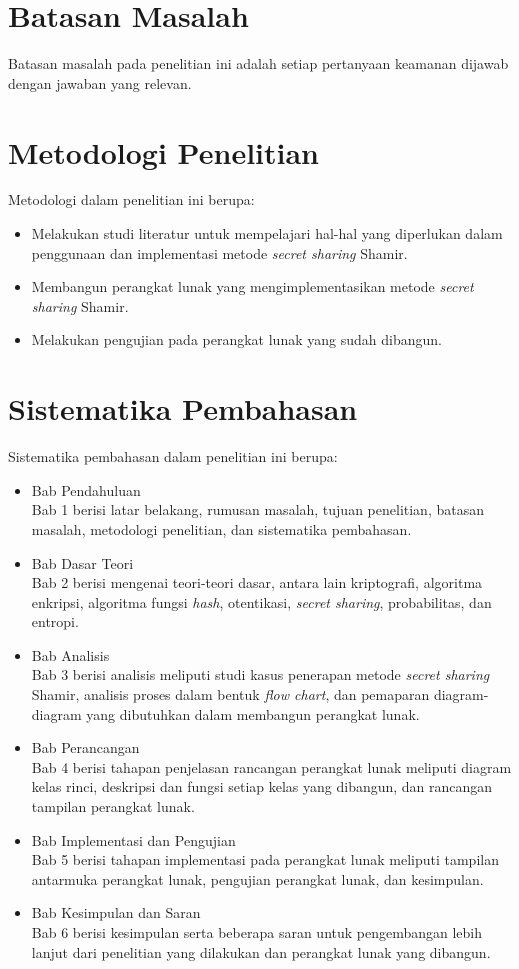 \section{Batasan Masalah}
\label{sec:batasan masalah}

Batasan masalah pada penelitian ini adalah setiap pertanyaan keamanan dijawab dengan jawaban yang relevan.

\section{Metodologi Penelitian}
\label{sec:metodologi penelitian}

Metodologi dalam penelitian ini berupa:
\begin{itemize}
	\item Melakukan studi literatur untuk mempelajari hal-hal yang diperlukan dalam penggunaan dan implementasi metode \textit{secret sharing} Shamir.
	\item Membangun perangkat lunak yang mengimplementasikan metode \textit{secret sharing} Shamir.
	\item Melakukan pengujian pada perangkat lunak yang sudah dibangun.
\end{itemize}

\section{Sistematika Pembahasan}
\label{sec:sistematika pembahasan}

Sistematika pembahasan dalam penelitian ini berupa:
\begin{itemize}
	\item Bab Pendahuluan
	\\Bab 1 berisi latar belakang, rumusan masalah, tujuan penelitian, batasan masalah, metodologi penelitian, dan sistematika pembahasan.
	\item Bab Dasar Teori
	\\Bab 2 berisi mengenai teori-teori dasar, antara lain kriptografi, algoritma enkripsi, algoritma fungsi \textit{hash}, otentikasi, \textit{secret sharing}, probabilitas, dan entropi.
	\item Bab Analisis
	\\Bab 3 berisi analisis meliputi studi kasus penerapan metode \textit{secret sharing} Shamir, analisis proses dalam bentuk \textit{flow chart}, dan pemaparan diagram-diagram yang dibutuhkan dalam membangun perangkat lunak.
	\item Bab Perancangan
	\\Bab 4 berisi tahapan penjelasan rancangan perangkat lunak meliputi diagram kelas rinci, deskripsi dan fungsi setiap kelas yang dibangun, dan rancangan tampilan perangkat lunak.
	\item Bab Implementasi dan Pengujian
	\\Bab 5 berisi tahapan implementasi pada perangkat lunak meliputi tampilan antarmuka perangkat lunak, pengujian perangkat lunak, dan kesimpulan.
	\item Bab Kesimpulan dan Saran
	\\Bab 6 berisi kesimpulan serta beberapa saran untuk pengembangan lebih lanjut dari penelitian yang dilakukan dan perangkat lunak yang dibangun.
\end{itemize}